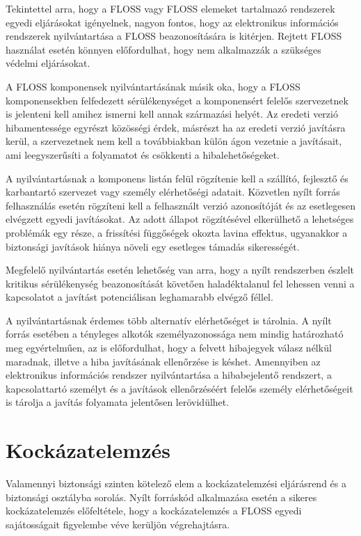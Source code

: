 \documentclass[12pt,magyar,a4paper,oneside]{scrreprt}
\begin{document}
Tekintettel arra, hogy a FLOSS vagy FLOSS elemeket tartalmazó rendszerek
egyedi eljárásokat igényelnek, nagyon fontos, hogy az elektronikus
információs rendszerek nyilvántartása a FLOSS beazonosítására is
kitérjen. Rejtett FLOSS használat esetén könnyen előfordulhat, hogy nem
alkalmazzák a szükséges védelmi eljárásokat.

A FLOSS komponensek nyilvántartásának másik oka, hogy a FLOSS
komponensekben felfedezett sérülékenységet a komponensért felelős
szervezetnek is jelenteni kell amihez ismerni kell annak származási
helyét. Az eredeti verzió hibamentessége egyrészt közösségi érdek,
másrészt ha az eredeti verzió javításra kerül, a szervezetnek nem kell a
továbbiakban külön ágon vezetnie a javításait, ami leegyszerűsíti a
folyamatot és csökkenti a hibalehetőségeket.

A nyilvántartásnak a komponens listán felül rögzítenie kell a szállító,
fejlesztő és karbantartó szervezet vagy személy elérhetőségi adatait.
Közvetlen nyílt forrás felhasználás esetén rögzíteni kell a felhasznált
verzió azonosítóját és az esetlegesen elvégzett egyedi javításokat. Az
adott állapot rögzítésével elkerülhető a lehetséges problémák egy része,
a frissítési függőségek okozta lavina effektus, ugyanakkor a biztonsági
javítások hiánya növeli egy esetleges támadás sikerességét.

Megfelelő nyilvántartás esetén lehetőség van arra, hogy a nyílt
rendszerben észlelt kritikus sérülékenység beazonosítását követően
haladéktalanul fel lehessen venni a kapcsolatot a javítást potenciálisan
leghamarabb elvégző féllel.

A nyilvántartásnak érdemes több alternatív elérhetőséget is tárolnia. A
nyílt forrás esetében a tényleges alkotók személyazonossága nem mindig
határozható meg egyértelműen, az is előfordulhat, hogy a felvett
hibajegyek válasz nélkül maradnak, illetve a hiba javításának
ellenőrzése is késhet. Amennyiben az elektronikus információs rendszer
nyilvántartása a hibabejelentő rendszert, a kapcsolattartó személyt és a
javítások ellenőrzéséért felelős személy elérhetőségeit is tárolja a
javítás folyamata jelentősen lerövidülhet.

\hypertarget{kockuxe1zatelemzuxe9s}{%
\section{Kockázatelemzés}\label{kockuxe1zatelemzuxe9s}}

Valamennyi biztonsági szinten kötelező elem a kockázatelemzési
eljárásrend és a biztonsági osztályba sorolás. Nyílt forráskód
alkalmazása esetén a sikeres kockázatelemzés előfeltétele, hogy a
kockázatelemzés a FLOSS egyedi sajátosságait figyelembe véve kerüljön
végrehajtásra.
\end{document}
